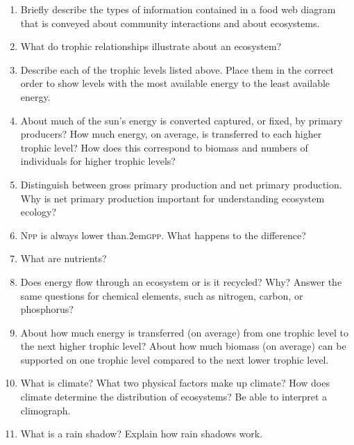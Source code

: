 \documentclass[letterpaper]{tufte-handout}
\begin{document}
\begin{enumerate}

	\item Briefly describe the types of information contained in a food web diagram that is conveyed about community interactions and about ecosystems.

	\item What do trophic relationships illustrate about an ecosystem?

	\item Describe each of the trophic levels listed above.  Place them in the correct order to show levels with the most available energy to the least available energy.

	\item About much of the sun's energy is converted captured, or fixed, by primary producers? How much energy, on average, is transferred to each higher trophic level?  How does this correspond to biomass and numbers of individuals for higher trophic levels?

	\item Distinguish between gross primary production and net primary production.  Why is net primary production important for understanding ecosystem ecology?
	
	\item N\textsc{pp}{} is always lower than\kern.2em\textsc{gpp}. What happens to the difference?

	\item What are nutrients?
	
	\item Does energy flow through an ecosystem or is it recycled?  Why?  Answer the same questions for chemical elements, such as nitrogen, carbon, or phosphorus?
	
	\item About how much energy is transferred (on average) from one trophic level to the next higher trophic level? About how much biomass (on average) can be supported on one trophic level compared to the next lower trophic level.

	\item What is climate?  What two physical factors make up climate? How does climate determine the distribution of ecosystems?  Be able to interpret a climograph.

	\item What is a rain shadow? Explain how rain shadows work.

\end{enumerate}
\end{document}
